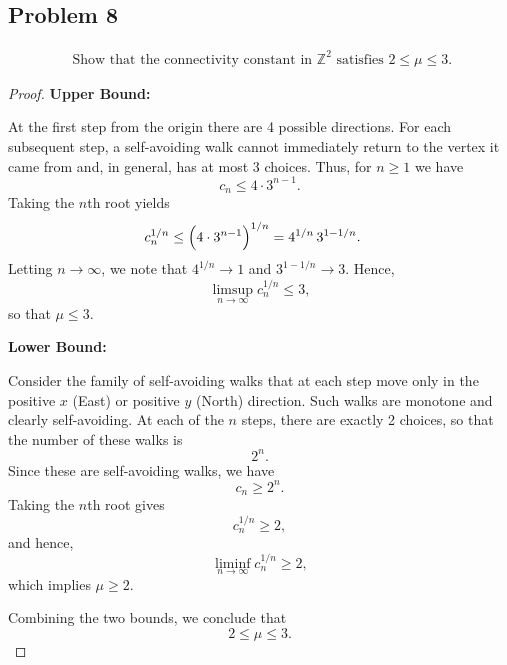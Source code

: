 \documentclass[letterpaper, 11pt]{article}
\newcommand{\1}{\mathds{1}}	%
\theoremstyle{definition}
\begin{document}
\subsection*{Problem 8}
\begin{align*}
\text{ Show that the connectivity constant in $\mathbb{Z}^2$ satisfies $2 \leq \mu \leq 3$.}
\end{align*}
\begin{proof}
    \textbf{Upper Bound:}

At the first step from the origin there are 4 possible directions. For each subsequent step, a self-avoiding walk cannot immediately return to the vertex it came from and, in general, has at most 3 choices. Thus, for \(n\ge 1\) we have
\[
c_n \le 4 \cdot 3^{n-1}.
\]
Taking the \(n\)th root yields
\begin{align*}
c_n^{1/n} &\le \Bigl(4 \cdot 3^{n-1}\Bigr)^{1/n}
= 4^{1/n} \, 3^{1-1/n}.
\end{align*}
Letting \(n\to\infty\), we note that \(4^{1/n} \to 1\) and \(3^{1-1/n} \to 3\). Hence,
\[
\limsup_{n\to\infty} c_n^{1/n} \le 3,
\]
so that \(\mu \le 3\).

\bigskip

\textbf{Lower Bound:}

Consider the family of self-avoiding walks that at each step move only in the positive \(x\) (East) or positive \(y\) (North) direction. Such walks are monotone and clearly self-avoiding. At each of the \(n\) steps, there are exactly 2 choices, so that the number of these walks is
\[
2^n.
\]
Since these are self-avoiding walks, we have
\[
c_n \ge 2^n.
\]
Taking the \(n\)th root gives
\[
c_n^{1/n} \ge 2,
\]
and hence,
\[
\liminf_{n\to\infty} c_n^{1/n} \ge 2,
\]
which implies \(\mu \ge 2\).

\bigskip

Combining the two bounds, we conclude that
\[
2 \le \mu \le 3.
\]

\end{proof}
    
\end{document}
